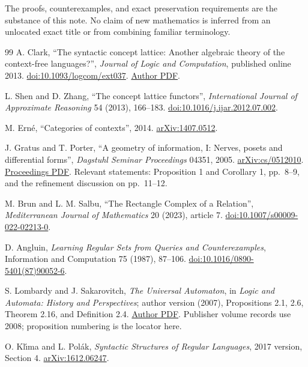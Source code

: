 \documentclass[11pt]{article}
\theoremstyle{remark}
\begin{document}
The proofs, counterexamples, and exact preservation requirements are the
substance of this note. No claim of new mathematics is inferred from an
unlocated exact title or from combining familiar terminology.
\begin{thebibliography}{99}
A. Clark, ``The syntactic concept lattice: Another algebraic theory of the
context-free languages?'', \emph{Journal of Logic and Computation},
published online 2013.
\href{https://doi.org/10.1093/logcom/ext037}{doi:10.1093/logcom/ext037}.
\href{https://alexc17.github.io/static/pdfs/JLC2013.pdf}{Author PDF}.

L. Shen and D. Zhang, ``The concept lattice functors'',
\emph{International Journal of Approximate Reasoning} 54 (2013), 166--183.
\href{https://doi.org/10.1016/j.ijar.2012.07.002}{doi:10.1016/j.ijar.2012.07.002}.

M. Ern\'e, ``Categories of contexts'', 2014.
\href{https://arxiv.org/abs/1407.0512}{arXiv:1407.0512}.

J. Gratus and T. Porter, ``A geometry of information, I: Nerves, posets
and differential forms'', \emph{Dagstuhl Seminar Proceedings} 04351,
2005.
\href{https://arxiv.org/abs/cs/0512010}{arXiv:cs/0512010}.
\href{https://drops.dagstuhl.de/storage/16dagstuhl-seminar-proceedings/dsp-vol04351/DagSemProc.04351.6/DagSemProc.04351.6.pdf}{Proceedings PDF}.
Relevant statements: Proposition 1 and Corollary 1, pp.~8--9, and the
refinement discussion on pp.~11--12.

M. Brun and L. M. Salbu, ``The Rectangle Complex of a Relation'',
\emph{Mediterranean Journal of Mathematics} 20 (2023), article 7.
\href{https://doi.org/10.1007/s00009-022-02213-0}{doi:10.1007/s00009-022-02213-0}.

D. Angluin, \emph{Learning Regular Sets from Queries and Counterexamples},
Information and Computation 75 (1987), 87--106.
\href{https://doi.org/10.1016/0890-5401(87)90052-6}{doi:10.1016/0890-5401(87)90052-6}.

S. Lombardy and J. Sakarovitch, \emph{The Universal Automaton}, in
\emph{Logic and Automata: History and Perspectives}; author version
(2007), Propositions 2.1, 2.6, Theorem 2.16, and Definition 2.4.
\href{https://perso.telecom-paristech.fr/jsaka/PUB/Files/TUA.pdf}{Author PDF}.
Publisher volume records use 2008; proposition numbering is the locator here.

O. Kl\'{\i}ma and L. Pol\'{a}k, \emph{Syntactic Structures of Regular
Languages}, 2017 version, Section 4.
\href{https://arxiv.org/abs/1612.06247}{arXiv:1612.06247}.


\end{thebibliography}
\end{document}
